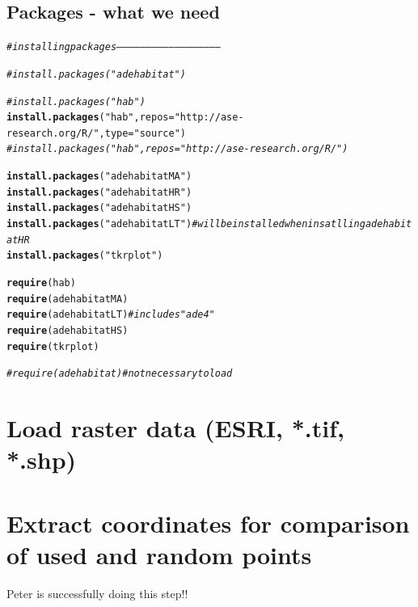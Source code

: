\documentclass[11pt, a4paper]{article}\usepackage[]{graphicx}\usepackage[]{color}
\makeatletter
\newcommand{\hlstr}[1]{\textcolor[rgb]{0.192,0.494,0.8}{#1}}%
\newcommand{\hlcom}[1]{\textcolor[rgb]{0.678,0.584,0.686}{\textit{#1}}}%
\newcommand{\hlstd}[1]{\textcolor[rgb]{0.345,0.345,0.345}{#1}}%
\newcommand{\hlkwc}[1]{\textcolor[rgb]{0.333,0.667,0.333}{#1}}%
\newcommand{\hlkwd}[1]{\textcolor[rgb]{0.737,0.353,0.396}{\textbf{#1}}}%
\newenvironment{kframe}{%
 \def\at@end@of@kframe{}%
 \ifinner\ifhmode%
  \def\at@end@of@kframe{\end{minipage}}%
  \begin{minipage}{\columnwidth}%
 \fi\fi%
 \def\FrameCommand##1{\hskip\@totalleftmargin \hskip-\fboxsep
 \colorbox{shadecolor}{##1}\hskip-\fboxsep
     \hskip-\linewidth \hskip-\@totalleftmargin \hskip\columnwidth}%
 \MakeFramed {\advance\hsize-\width
   \@totalleftmargin\z@ \linewidth\hsize
   \@setminipage}}%
 {\par\unskip\endMakeFramed%
 \at@end@of@kframe}
\newenvironment{knitrout}{}{} %
\makeatother
\begin{document}
\subsection{Packages - what we need}

\begin{knitrout}
\color{fgcolor}\begin{kframe}
\begin{alltt}
\hlcom{# installing packages -----------------------------------------------------}

\hlcom{# install.packages("adehabitat")}

\hlcom{# install.packages("hab")}
\hlkwd{install.packages}\hlstd{(}\hlstr{"hab"}\hlstd{,} \hlkwc{repos} \hlstd{=} \hlstr{"http://ase-research.org/R/"}\hlstd{,} \hlkwc{type} \hlstd{=} \hlstr{"source"}\hlstd{)}
\hlcom{# install.packages("hab", repos = "http://ase-research.org/R/")}

\hlkwd{install.packages}\hlstd{(}\hlstr{"adehabitatMA"}\hlstd{)}
\hlkwd{install.packages}\hlstd{(}\hlstr{"adehabitatHR"}\hlstd{)}
\hlkwd{install.packages}\hlstd{(}\hlstr{"adehabitatHS"}\hlstd{)}
\hlkwd{install.packages}\hlstd{(}\hlstr{"adehabitatLT"}\hlstd{)} \hlcom{# will be installed when insatlling adehabitatHR}
\hlkwd{install.packages}\hlstd{(}\hlstr{"tkrplot"}\hlstd{)}


\hlkwd{require}\hlstd{(hab)}
\hlkwd{require}\hlstd{(adehabitatMA)}
\hlkwd{require}\hlstd{(adehabitatLT)}  \hlcom{# includes "ade4"}
\hlkwd{require}\hlstd{(adehabitatHS)}
\hlkwd{require}\hlstd{(tkrplot)}

\hlcom{# require(adehabitat)  # not necessary to load}
\end{alltt}
\end{kframe}
\end{knitrout}


\section{Load raster data (ESRI, *.tif, *.shp)}%


\section{Extract coordinates for comparison of used and random points} %
Peter is successfully doing this step!!
\end{document}
